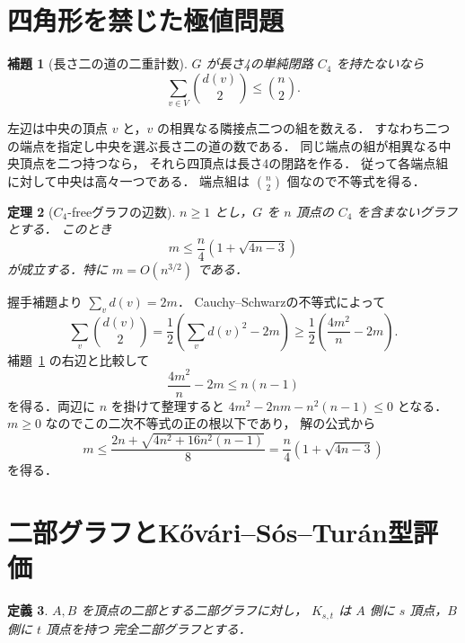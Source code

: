\documentclass[a5paper,10pt,onecolumn]{jsarticle}
\makeatletter
\theoremstyle{mathnotetheorem}
\newtheorem{theorem}{定理}[section]
\newtheorem{definition}[theorem]{定義}
\newtheorem{lemma}[theorem]{補題}
\renewcommand{\proofname}{証明}
\renewenvironment{proof}[1][\proofname]{%
  \par\pushQED{\qed}\normalfont\topsep4\p@\@plus2\p@\relax
  \trivlist\item[\hskip\labelsep\bfseries #1]\ignorespaces
}{\popQED\endtrivlist\@endpefalse}
\makeatother
\begin{document}
\section{四角形を禁じた極値問題}
\begin{lemma}[長さ二の道の二重計数]\label{lem:c4count}
$G$ が長さ4の単純閉路 $C_4$ を持たないなら
\begin{equation}\label{eq:c4count}
 \sum_{v\in V}{d(v)\choose2}\le {n\choose2}.
\end{equation}
\end{lemma}
\begin{proof}
左辺は中央の頂点 $v$ と，$v$ の相異なる隣接点二つの組を数える．
すなわち二つの端点を指定し中央を選ぶ長さ二の道の数である．
同じ端点の組が相異なる中央頂点を二つ持つなら，
それら四頂点は長さ4の閉路を作る．
従って各端点組に対して中央は高々一つである．
端点組は ${n\choose2}$ 個なので不等式を得る．
\end{proof}

\begin{theorem}[$C_4$-freeグラフの辺数]\label{thm:c4}
$n\ge1$ とし，$G$ を $n$ 頂点の $C_4$ を含まないグラフとする．
このとき
\begin{equation}\label{eq:c4upper}
 m\le\frac n4\left(1+\sqrt{4n-3}\right)
\end{equation}
が成立する．特に $m=O(n^{3/2})$ である．
\end{theorem}
\begin{proof}
握手補題より $\sum_v d(v)=2m$．
Cauchy--Schwarzの不等式によって
\[
 \sum_v{d(v)\choose2}
 =\frac12\left(\sum_vd(v)^2-2m\right)
 \ge\frac12\left(\frac{4m^2}{n}-2m\right).
\]
補題~\ref{lem:c4count} の右辺と比較して
\[
 \frac{4m^2}{n}-2m\le n(n-1)
\]
を得る．両辺に $n$ を掛けて整理すると
$4m^2-2nm-n^2(n-1)\le0$ となる．
$m\ge0$ なのでこの二次不等式の正の根以下であり，
解の公式から
\[
 m\le\frac{2n+\sqrt{4n^2+16n^2(n-1)}}8
 =\frac n4(1+\sqrt{4n-3})
\]
を得る．
\end{proof}

\section{二部グラフとK\H{o}v\'ari--S\'os--Tur\'an型評価}
\begin{definition}
$A,B$ を頂点の二部とする二部グラフに対し，
$K_{s,t}$ は $A$ 側に $s$ 頂点，$B$ 側に $t$ 頂点を持つ
完全二部グラフとする．
\end{definition}
\end{document}
